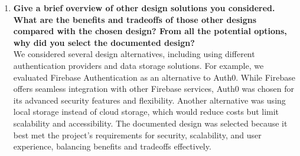 \documentclass[12pt, titlepage]{article}
\begin{document}
\begin{enumerate}
  \item \textbf{Give a brief overview of other design solutions you considered. What are the benefits and tradeoffs of those other designs compared with the chosen design? From all the potential options, why did you select the documented design?}  \\
  We considered several design alternatives, including using different authentication providers and data storage solutions. For example, we evaluated Firebase Authentication as an alternative to Auth0. While Firebase offers seamless integration with other Firebase services, Auth0 was chosen for its advanced security features and flexibility. Another alternative was using local storage instead of cloud storage, which would reduce costs but limit scalability and accessibility. The documented design was selected because it best met the project's requirements for security, scalability, and user experience, balancing benefits and tradeoffs effectively.
\end{enumerate}
\end{document}
